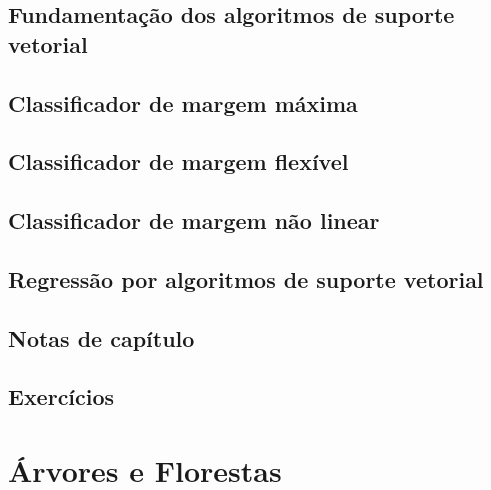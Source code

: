 \documentclass[
]{latex/krantz}
\theoremstyle{definition}
\theoremstyle{definition}
\theoremstyle{definition}
\theoremstyle{definition}
\theoremstyle{remark}
\begin{document}
\hypertarget{fundamentauxe7uxe3o-dos-algoritmos-de-suporte-vetorial}{%
\section{Fundamentação dos algoritmos de suporte vetorial}\label{fundamentauxe7uxe3o-dos-algoritmos-de-suporte-vetorial}}

\hypertarget{classificador-de-margem-muxe1xima}{%
\section{Classificador de margem máxima}\label{classificador-de-margem-muxe1xima}}

\hypertarget{classificador-de-margem-flexuxedvel}{%
\section{Classificador de margem flexível}\label{classificador-de-margem-flexuxedvel}}

\hypertarget{classificador-de-margem-nuxe3o-linear}{%
\section{Classificador de margem não linear}\label{classificador-de-margem-nuxe3o-linear}}

\hypertarget{regressuxe3o-por-algoritmos-de-suporte-vetorial}{%
\section{Regressão por algoritmos de suporte vetorial}\label{regressuxe3o-por-algoritmos-de-suporte-vetorial}}

\hypertarget{notas-de-capuxedtulo-8}{%
\section{Notas de capítulo}\label{notas-de-capuxedtulo-8}}

\hypertarget{exercuxedcios-8}{%
\section{Exercícios}\label{exercuxedcios-8}}

\hypertarget{uxe1rvores-e-florestas}{%
\chapter{Árvores e Florestas}\label{uxe1rvores-e-florestas}}
\end{document}
